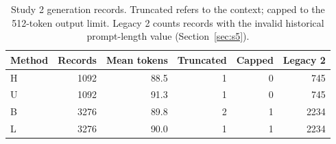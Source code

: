 \begin{table}[htbp]\centering\small
\caption{Study 2 generation records. Truncated refers to the context; capped to the 512-token output limit. Legacy 2 counts records with the invalid historical prompt-length value (Section~\ref{sec:s5}).}\label{tab:generation}
\begin{tabular}{lrrrrr}\toprule
Method & Records & Mean tokens & Truncated & Capped & Legacy 2\\\midrule
H & 1092 & 88.5 & 1 & 0 & 745\\
U & 1092 & 91.3 & 1 & 0 & 745\\
B & 3276 & 89.8 & 2 & 1 & 2234\\
L & 3276 & 90.0 & 1 & 1 & 2234\\
\bottomrule\end{tabular}\end{table}
